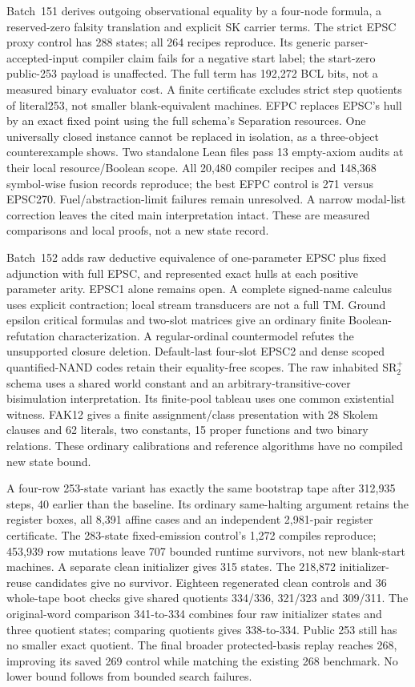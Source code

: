 \documentclass[11pt]{article}
\begin{document}
{Batch~151 derives outgoing observational equality by a four-node formula,
a reserved-zero falsity translation and explicit SK carrier terms. The strict
EPSC proxy control has 288 states; all 264 recipes reproduce. Its generic
parser-accepted-input compiler claim fails for a negative start label; the
start-zero public-253 payload is unaffected. The full term has 192,272 BCL bits,
not a measured binary evaluator cost. A finite certificate excludes strict
step quotients of literal253, not smaller blank-equivalent machines.
EFPC replaces EPSC's hull by an exact fixed point using the full schema's
Separation resources. One universally closed instance cannot be replaced in
isolation, as a three-object counterexample shows. Two standalone Lean files
pass 13 empty-axiom audits at their local resource/Boolean scope. All 20,480
compiler recipes and 148,368 symbol-wise fusion records reproduce; the best
EFPC control is 271 versus EPSC270. Fuel/abstraction-limit failures remain
unresolved. A narrow modal-list correction leaves the cited main interpretation
intact. These are measured comparisons and local proofs, not a new state record.

Batch~152 adds raw deductive equivalence of one-parameter EPSC plus fixed
adjunction with full EPSC, and represented exact hulls at each positive
parameter arity. EPSC1 alone remains open. A complete signed-name calculus
uses explicit contraction; local stream transducers are not a full TM.
Ground epsilon critical formulas and two-slot matrices give an ordinary
finite Boolean-refutation characterization. A regular-ordinal countermodel
refutes the unsupported closure deletion. Default-last four-slot EPSC2 and
dense scoped quantified-NAND codes retain their equality-free scopes.
The raw inhabited SR$_2^+$ schema uses a shared world constant and an
arbitrary-transitive-cover bisimulation interpretation. Its finite-pool
tableau uses one common existential witness. FAK12 gives a finite
assignment/class presentation with 28 Skolem clauses and 62 literals,
two constants, 15 proper functions and two binary relations. These ordinary
calibrations and reference algorithms have no compiled new state bound.

A four-row 253-state variant has exactly the same bootstrap tape after
312,935 steps, 40 earlier than the baseline. Its ordinary same-halting
argument retains the register boxes, all 8,391 affine cases and an independent
2,981-pair register certificate. The 283-state fixed-emission control's
1,272 compiles reproduce; 453,939 row mutations leave 707 bounded runtime
survivors, not new blank-start machines. A separate clean initializer gives
315 states. The 218,872 initializer-reuse candidates give no survivor.
Eighteen regenerated clean controls and 36 whole-tape boot checks give shared
quotients 334/336, 321/323 and 309/311. The original-word comparison 341-to-334
combines four raw initializer states and three quotient states; comparing
quotients gives 338-to-334. Public 253 still has no smaller exact quotient.
The final broader protected-basis replay reaches 268, improving its saved 269
control while matching the existing 268 benchmark. No lower bound follows
from bounded search failures.

}
\end{document}
